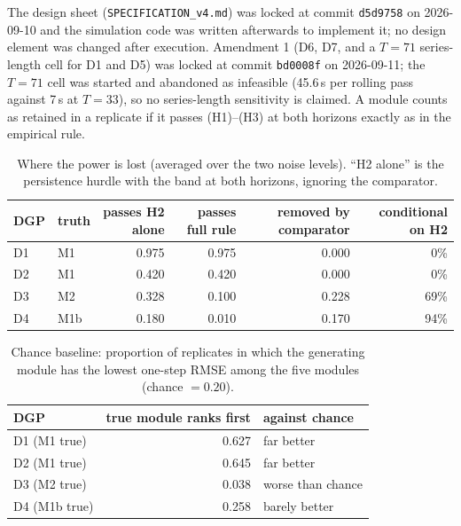 The design sheet (\texttt{SPECIFICATION\_v4.md}) was locked at commit \texttt{d5d9758} on 2026-09-10 and the simulation code was written afterwards to implement it; no design element was changed after execution. Amendment 1 (D6, D7, and a $T=71$ series-length cell for D1 and D5) was locked at commit \texttt{bd0008f} on 2026-09-11; the $T=71$ cell was started and abandoned as infeasible (45.6\,s per rolling pass against 7\,s at $T=33$), so no series-length sensitivity is claimed. A module counts as retained in a replicate if it passes (H1)--(H3) at both horizons exactly as in the empirical rule.

\begin{table}[!htb]
\centering\small
\caption{Where the power is lost (averaged over the two noise levels). ``H2 alone'' is the persistence hurdle with the band at both horizons, ignoring the comparator.}
\label{tab:si_power}
\scriptsize\setlength{\tabcolsep}{2.5pt}
\begin{tabular}{@{}llrrrr@{}}
\toprule
DGP & truth & passes H2 alone & passes full rule & removed by comparator & conditional on H2 \\
\midrule
D1 & M1 & 0.975 & 0.975 & 0.000 & 0\% \\
D2 & M1 & 0.420 & 0.420 & 0.000 & 0\% \\
D3 & M2 & 0.328 & 0.100 & 0.228 & 69\% \\
D4 & M1b & 0.180 & 0.010 & 0.170 & 94\% \\
\bottomrule
\end{tabular}
\end{table}

\begin{table}[!htb]
\centering\small
\caption{Chance baseline: proportion of replicates in which the generating module has the lowest one-step RMSE among the five modules (chance $=0.20$).}
\label{tab:si_chance}
\begin{tabular}{@{}lrl@{}}
\toprule
DGP & true module ranks first & against chance \\
\midrule
D1 (M1 true) & 0.627 & far better \\
D2 (M1 true) & 0.645 & far better \\
D3 (M2 true) & 0.038 & worse than chance \\
D4 (M1b true) & 0.258 & barely better \\
\bottomrule
\end{tabular}
\end{table}

